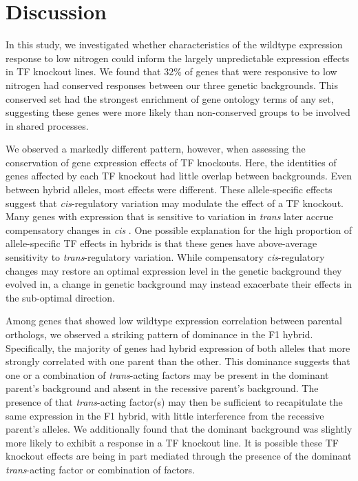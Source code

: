 \section{Discussion}

In this study, we investigated whether characteristics of the wildtype expression response to low nitrogen could inform the largely unpredictable expression effects in TF knockout lines. We found that 32\% of genes that were responsive to low nitrogen had conserved responses between our three genetic backgrounds. This conserved set had the strongest enrichment of gene ontology terms of any set, suggesting these genes were more likely than non-conserved groups to be involved in shared processes.

We observed a markedly different pattern, however, when assessing the conservation of gene expression effects of TF knockouts. Here, the identities of genes affected by each TF knockout had little overlap between backgrounds. Even between hybrid alleles, most effects were different. These allele-specific effects suggest that \textit{cis}-regulatory variation may modulate the effect of a TF knockout. Many genes with expression that is sensitive to variation in \textit{trans} later accrue compensatory changes in \textit{cis} \cite{Metzger2017, Metzger2019}. One possible explanation for the high proportion of allele-specific TF effects in hybrids is that these genes have above-average sensitivity to \textit{trans}-regulatory variation. While compensatory \textit{cis}-regulatory changes may restore an optimal expression level in the genetic background they evolved in, a change in genetic background may instead exacerbate their effects in the sub-optimal direction.

Among genes that showed low wildtype expression correlation between parental orthologs, we observed a striking pattern of dominance in the F1 hybrid. Specifically, the majority of genes had hybrid expression of both alleles that more strongly correlated with one parent than the other. This dominance suggests that one or a combination of \textit{trans}-acting factors may be present in the dominant parent's background and absent in the recessive parent's background. The presence of that \textit{trans}-acting factor(s) may then be sufficient to recapitulate the same expression in the F1 hybrid, with little interference from the recessive parent's alleles. We additionally found that the dominant background was slightly more likely to exhibit a response in a TF knockout line. It is possible these TF knockout effects are being in part mediated through the presence of the dominant \textit{trans}-acting factor or combination of factors.

